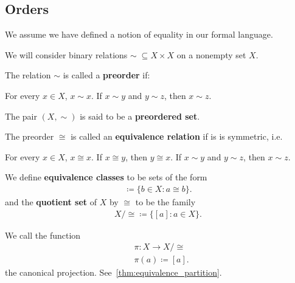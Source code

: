 \subsection{Orders}\label{sec:orders}

We assume we have defined a notion of equality in our formal language.

\begin{definition}\label{def:order}
  We will consider binary relations \( \sim\; \subseteq X \times X \) on a nonempty set \( X \).

  \begin{defenum}
    \item\label{def:order/preorder}\cite{nLab:preorder} The relation \( \sim \) is called a \textbf{preorder} if:
    \begin{description}
       For every \( x \in X \), \( x \sim x \).
       If \( x \sim y \) and \( y \sim z \), then \( x \sim z \).
    \end{description}

    The pair \( (X, \sim) \) is said to be a \textbf{preordered set}.

    \item\label{def:order/equivalence}\cite[56]{Enderton1977} The preorder \( \cong \) is called an \textbf{equivalence relation} if is is symmetric, i.e.
    \begin{description}
       For every \( x \in X \), \( x \cong x \).
       If \( x \cong y \), then \( y \cong x \).
       If \( x \sim y \) and \( y \sim z \), then \( x \sim z \).
    \end{description}

    We define \textbf{equivalence classes} to be sets of the form
    \begin{align*}
      [a] \coloneqq \{ b \in X \colon a \cong b \}.
    \end{align*}
    and the \textbf{quotient set} of \( X \) by \( \cong \) to be the family
    \begin{align*}
      X / \cong \coloneqq \{ [a] \colon a \in X \}.
    \end{align*}

    We call the function
    \begin{align*}
      &\pi: X \to X / \cong \\
      &\pi(a) \coloneqq [a].
    \end{align*}
    the canonical projection. See~\cref{thm:equivalence_partition}.


\end{defenum}
\end{definition}
